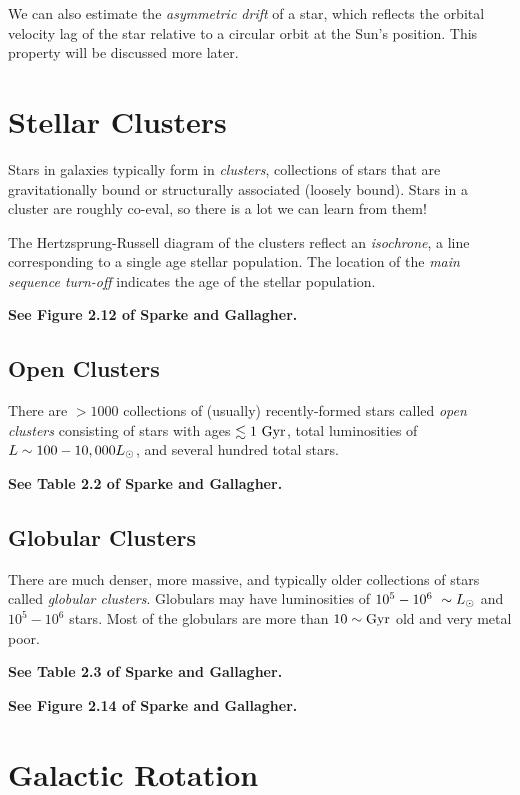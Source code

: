 \documentclass[]{article}
\begin{document}
We can also estimate the {\it asymmetric drift} of a star, which
reflects the orbital velocity lag of the star relative to a 
circular orbit at the Sun's position. This property will be
discussed more later.

\section{Stellar Clusters}

Stars in galaxies typically form in {\it clusters}, collections
of stars that are gravitationally bound or structurally associated
(loosely bound).
Stars in a cluster are roughly co-eval, so there is a lot we
can learn from them!

The Hertzsprung-Russell diagram of the clusters reflect an
{\it isochrone}, a line corresponding to a single age stellar
population. The location of the {\it main sequence turn-off}
indicates the age of the stellar population.

{\bf See Figure 2.12 of Sparke and Gallagher.}

\subsection{Open Clusters}

There are $>1000$ collections of (usually) recently-formed stars
called {\it open clusters} consisting of stars with
ages $\lesssim1~\mathrm{Gyr}$, total luminosities of 
$L\sim100-10,000L_{\odot}$, and several hundred total stars.

{\bf See Table 2.2 of Sparke and Gallagher.}


\subsection{Globular Clusters}

There are much denser, more massive, and typically older
collections of stars called {\it globular clusters}.
Globulars may have luminosities of $10^5-10^6~\sim L_{\odot}$ 
and $10^{5}-10^6$ stars. Most of the globulars are more
than $10\sim\mathrm{Gyr}$ old and very metal poor.

{\bf See Table 2.3 of Sparke and Gallagher.}

{\bf See Figure 2.14 of Sparke and Gallagher.}


\section{Galactic Rotation}
\end{document}
